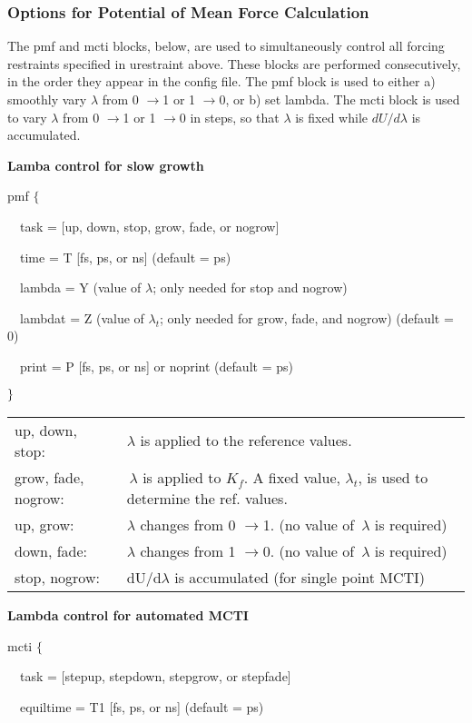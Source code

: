 \subsubsection{Options for Potential of Mean Force Calculation}

The pmf and mcti blocks, below, are used to simultaneously control all
forcing restraints specified in urestraint above. These blocks are performed
consecutively, in the order they appear in the config file. The pmf block is
used to either a) smoothly vary $\lambda $ from 0 $\rightarrow $1 or 1 $
\rightarrow $0, or b) set lambda. The mcti block is used to vary $\lambda $
from 0 $\rightarrow $1 or 1 $\rightarrow $0 in steps, so that $\lambda $ is
fixed while $dU/d\lambda $ is accumulated.\medskip

{\bf Lamba control for slow growth}

pmf $\{$

~~task = [up, down, stop, grow, fade, or nogrow]

~~time = T [fs, ps, or ns] (default = ps)

~~lambda = Y (value of $\lambda $; only needed for stop and nogrow)

~~lambdat = Z (value of $\lambda _{t}$; only needed for grow, fade, and
nogrow) (default = 0)

~~print = P [fs, ps, or ns] or noprint (default = ps)

$\}\medskip $

\begin{tabular}{ll}
up, down, stop: & $\lambda $ is applied to the reference values. \\ 
grow, fade, nogrow: & $\,\lambda $ is applied to $K_{f}$. A fixed value, $
\lambda _{t}$, is used to determine the ref. values. \\ 
up, grow: & $\lambda $ changes from 0 $\rightarrow $1. (no value of $
\,\lambda $ is required) \\ 
down, fade: & $\lambda $ changes from 1 $\rightarrow $0. (no value of $
\,\lambda $ is required) \\ 
stop, nogrow: & dU/d$\lambda $ is accumulated (for single point
MCTI)\medskip \smallskip
\end{tabular}
\bigskip

{\bf Lambda control for automated MCTI}

mcti $\{$

~~task = [stepup, stepdown, stepgrow, or stepfade]

~~equiltime = T1 [fs, ps, or ns] (default = ps)

